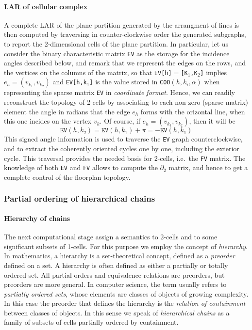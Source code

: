 \documentclass[]{egpubl}
\begin{document}
\paragraph*{LAR of cellular
complex}\label{reconstruction-of-lar-of-the-cellular-complex}

A complete LAR of the plane partition generated by the arrangment of
lines is then computed by traversing in
counter-clockwise order the generated subgraphs, to report the
2-dimensional cells of the plane partition.
In particular, let us consider the binary characteristic matrix \texttt{EV} as the storage for the incidence angles described below, and remark that we represent the edges on the
rows, and the vertices on the columns of the matrix, so that \texttt{EV[h]$=$[K$_1$,K$_2$]} implies $e_h = (v_{k_1},v_{k_2})$ 
and \texttt{EV[h,k$_1$]} is the value stored in 
\texttt{COO$(h,k_i,\alpha)$} when representing the sparse matrix \texttt{EV} in \emph{coordinate format}. 
Hence, we can readily reconstruct the topology of 2-cells by
associating to each non-zero (sparse matrix) element
the angle in radians that the edge $e_h$ forms
with the orizontal line, when this one incides on the vertex $v_k$.
Of course, if $e_h = (v_{k_1},v_{k_2})$, then it will be 
\[
\texttt{EV}(h,k_2) = \texttt{EV}(h,k_1)+\pi = -\texttt{EV}(h,k_1)
\]
This signed angle information is used to traverse the \texttt{EV} graph counterclockwise, and to extract the coherently oriented cycles one by one,
including the exterior cycle. This traversal provides the needed basis for 2-cells, i.e.~the \texttt{FV} matrix. The knowledge of both \texttt{EV} and \texttt{FV} allows to compute the $\partial_2$ matrix, and hence to get a complete control of the floorplan topology.

\subsubsection*{Partial ordering of hierarchical chains}

\paragraph*{Hierarchy of chains}

The next computational stage assign a semantics to 2-cells and to some significant subsets of 1-cells. For this purpose we employ the concept of \emph{hierarchy}.
In mathematics, a hierarchy is a set-theoretical concept, defined as a \emph{preorder} defined on a set. A hierarchy is often defined as either a partially or totally ordered set. All partial orders and equivalence relations are preorders, but preorders are more general. 
In computer science, the term usually refers to \emph{partially ordered sets}, whose elements are classes of objects of growing complexity. In this case the preorder that defines the hierarchy is the \emph{relation of containment} between classes of objects. In this sense we speak of \emph{hierarchical chains} as a family of subsets of cells partially ordered by containment.
\end{document}

